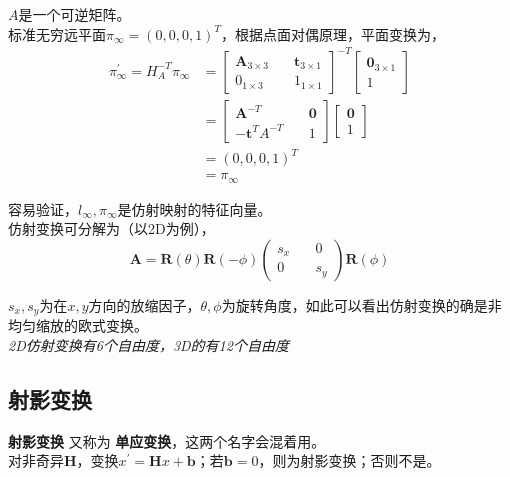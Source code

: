 		$A$是一个可逆矩阵。\\

		标准无穷远平面$\pi_{\infty} = (0,0,0,1)^T$，根据点面对偶原理，平面变换为，
		\begin{align*}
			\pi_{\infty}^{\prime} = H_A^{-T}\pi_{\infty} 
			&=
			\begin{bmatrix}
				\mathbf{A}_{3\times 3}\quad& \mathbf{t}_{3\times 1}\\
				0_{1\times 3} \quad& 1_{1\times 1}
			\end{bmatrix}^{-T}
			\begin{bmatrix}
				\mathbf{0}_{3\times 1}\\
				1
			\end{bmatrix}\\
			&=
			\begin{bmatrix}
				\mathbf{A}^{-T}\quad& \mathbf{0}\\
				-\mathbf{t}^TA^{-T} \quad& 1
			\end{bmatrix}
			\begin{bmatrix}
				\mathbf{0}\\
				1
			\end{bmatrix}\\
			&= (0,0,0,1)^T\\
			&=\pi_{\infty} 
		\end{align*}

		容易验证，$l_{\infty}, \pi_{\infty}$是仿射映射的特征向量。\\

		仿射变换可分解为（以2D为例），
		$$
			\mathbf{A} = \mathbf{R}(\theta)\mathbf{R}(-\phi)
			\begin{pmatrix}
				s_x \quad &0\\
				0 \quad & s_y
			\end{pmatrix}
			\mathbf{R}(\phi)
		$$

		$s_x,s_y$为在$x,y$方向的放缩因子，$\theta,\phi$为旋转角度，如此可以看出仿射变换的确是非均匀缩放的欧式变换。\\

		\textit{2D仿射变换有6个自由度，3D的有12个自由度}
	
	\subsection{射影变换}

		\textbf{射影变换} 又称为 \textbf{单应变换}，这两个名字会混着用。\\

		对非奇异$\mathbf{H}$，变换$x^\prime = \mathbf{H}x + \mathbf{b}$；若$\mathbf{b} = 0$，则为射影变换；否则不是。\\

